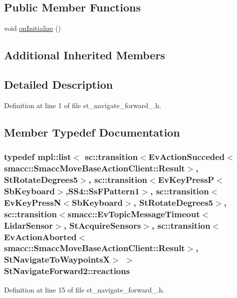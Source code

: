 \subsection*{Public Member Functions}
\begin{DoxyCompactItemize}
\item 
void \hyperlink{structStNavigateForward2_ac08065dc561a98ca39edaed1982aa986}{on\+Initialize} ()
\end{DoxyCompactItemize}
\subsection*{Additional Inherited Members}


\subsection{Detailed Description}


Definition at line 1 of file st\+\_\+navigate\+\_\+forward\+\_.\+h.



\subsection{Member Typedef Documentation}
\subsubsection[{\texorpdfstring{reactions}{reactions}}]{\setlength{\rightskip}{0pt plus 5cm}typedef mpl\+::list$<$ sc\+::transition$<$Ev\+Action\+Succeded$<$smacc\+::\+Smacc\+Move\+Base\+Action\+Client\+::\+Result$>$, {\bf St\+Rotate\+Degrees5}$>$, sc\+::transition$<$Ev\+Key\+PressP$<$Sb\+Keyboard$>$,{\bf S\+S4\+::\+Ss\+F\+Pattern1}$>$, sc\+::transition$<$Ev\+Key\+PressN$<$Sb\+Keyboard$>$, {\bf St\+Rotate\+Degrees5}$>$, sc\+::transition$<${\bf smacc\+::\+Ev\+Topic\+Message\+Timeout}$<${\bf Lidar\+Sensor}$>$, {\bf St\+Acquire\+Sensors}$>$, sc\+::transition$<$Ev\+Action\+Aborted$<$smacc\+::\+Smacc\+Move\+Base\+Action\+Client\+::\+Result$>$, {\bf St\+Navigate\+To\+WaypointsX}$>$ $>$ {\bf St\+Navigate\+Forward2\+::reactions}}\hypertarget{structStNavigateForward2_a804708f3d98ef46f3c5d5938c8cbcf14}{}\label{structStNavigateForward2_a804708f3d98ef46f3c5d5938c8cbcf14}


Definition at line 15 of file st\+\_\+navigate\+\_\+forward\+\_.\+h.



